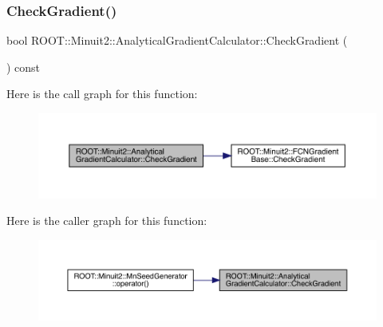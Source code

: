 \subsubsection{\texorpdfstring{CheckGradient()}{CheckGradient()}\hspace{0.1cm}{\footnotesize\ttfamily [1/3]}}
{\footnotesize\ttfamily bool R\+O\+O\+T\+::\+Minuit2\+::\+Analytical\+Gradient\+Calculator\+::\+Check\+Gradient (\begin{DoxyParamCaption}{ }\end{DoxyParamCaption}) const\hspace{0.3cm}{\ttfamily [virtual]}}

Here is the call graph for this function\+:
\nopagebreak
\begin{figure}[H]
\begin{center}
\leavevmode
\includegraphics[width=350pt]{dd/d3a/classROOT_1_1Minuit2_1_1AnalyticalGradientCalculator_adee37f46da7ed30710a050462c0aa6f0_cgraph}
\end{center}
\end{figure}
Here is the caller graph for this function\+:
\nopagebreak
\begin{figure}[H]
\begin{center}
\leavevmode
\includegraphics[width=350pt]{dd/d3a/classROOT_1_1Minuit2_1_1AnalyticalGradientCalculator_adee37f46da7ed30710a050462c0aa6f0_icgraph}
\end{center}
\end{figure}
\mbox{\label{classROOT_1_1Minuit2_1_1AnalyticalGradientCalculator_aad6bcafd96845df588392bb7b255ece8}} 
